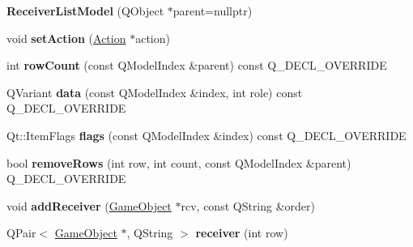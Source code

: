 \begin{DoxyCompactItemize}
\item 
\hypertarget{class_receiver_list_model_aaf83b5fc691fbe51e1c17d7a56874dfc}{{\bfseries \-Receiver\-List\-Model} (\-Q\-Object $\ast$parent=nullptr)}\label{class_receiver_list_model_aaf83b5fc691fbe51e1c17d7a56874dfc}

\item 
\hypertarget{class_receiver_list_model_a320a76f5af0bb6d539d16e5162e142e1}{void {\bfseries set\-Action} (\hyperlink{class_action}{\-Action} $\ast$action)}\label{class_receiver_list_model_a320a76f5af0bb6d539d16e5162e142e1}

\item 
\hypertarget{class_receiver_list_model_a757e507b71983aea8ec894b3b038ea28}{int {\bfseries row\-Count} (const \-Q\-Model\-Index \&parent) const \-Q\-\_\-\-D\-E\-C\-L\-\_\-\-O\-V\-E\-R\-R\-I\-D\-E}\label{class_receiver_list_model_a757e507b71983aea8ec894b3b038ea28}

\item 
\hypertarget{class_receiver_list_model_a1d317e6038ef10a1a544a3ec0ff15ade}{\-Q\-Variant {\bfseries data} (const \-Q\-Model\-Index \&index, int role) const \-Q\-\_\-\-D\-E\-C\-L\-\_\-\-O\-V\-E\-R\-R\-I\-D\-E}\label{class_receiver_list_model_a1d317e6038ef10a1a544a3ec0ff15ade}

\item 
\hypertarget{class_receiver_list_model_a54253304ea5ddbb77c097f8d575453cd}{\-Qt\-::\-Item\-Flags {\bfseries flags} (const \-Q\-Model\-Index \&index) const \-Q\-\_\-\-D\-E\-C\-L\-\_\-\-O\-V\-E\-R\-R\-I\-D\-E}\label{class_receiver_list_model_a54253304ea5ddbb77c097f8d575453cd}

\item 
\hypertarget{class_receiver_list_model_a73833c606ec1313dd3233a7b99dcff80}{bool {\bfseries remove\-Rows} (int row, int count, const \-Q\-Model\-Index \&parent) \-Q\-\_\-\-D\-E\-C\-L\-\_\-\-O\-V\-E\-R\-R\-I\-D\-E}\label{class_receiver_list_model_a73833c606ec1313dd3233a7b99dcff80}

\item 
\hypertarget{class_receiver_list_model_ad715e8f10586129f38c1330f240f9042}{void {\bfseries add\-Receiver} (\hyperlink{class_game_object}{\-Game\-Object} $\ast$rcv, const \-Q\-String \&order)}\label{class_receiver_list_model_ad715e8f10586129f38c1330f240f9042}

\item 
\hypertarget{class_receiver_list_model_a7651081bc72e4f82f1047f8bf73f545d}{\-Q\-Pair$<$ \hyperlink{class_game_object}{\-Game\-Object} $\ast$, \-Q\-String $>$ {\bfseries receiver} (int row)}\label{class_receiver_list_model_a7651081bc72e4f82f1047f8bf73f545d}

\end{DoxyCompactItemize}


